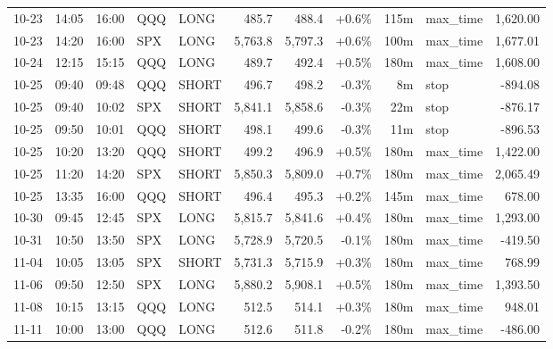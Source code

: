 \documentclass[11pt,a4paper,twoside]{article}
\begin{document}
\begin{center}
\begin{longtable}{>{\color{txtmain}}l l l l l r r r r >{\color{txtmain}}l r}
10-23 & 14:05 & 16:00 & QQQ & LONG & 485.7 & 488.4 & \textcolor{wingreen}{+0.6\%} & 115m & max\_time & \textcolor{wingreen}{1,620.00} \\
10-23 & 14:20 & 16:00 & SPX & LONG & 5,763.8 & 5,797.3 & \textcolor{wingreen}{+0.6\%} & 100m & max\_time & \textcolor{wingreen}{1,677.01} \\
10-24 & 12:15 & 15:15 & QQQ & LONG & 489.7 & 492.4 & \textcolor{wingreen}{+0.5\%} & 180m & max\_time & \textcolor{wingreen}{1,608.00} \\
10-25 & 09:40 & 09:48 & QQQ & SHORT & 496.7 & 498.2 & \textcolor{lossred}{-0.3\%} & 8m & stop & \textcolor{lossred}{-894.08} \\
10-25 & 09:40 & 10:02 & SPX & SHORT & 5,841.1 & 5,858.6 & \textcolor{lossred}{-0.3\%} & 22m & stop & \textcolor{lossred}{-876.17} \\
10-25 & 09:50 & 10:01 & QQQ & SHORT & 498.1 & 499.6 & \textcolor{lossred}{-0.3\%} & 11m & stop & \textcolor{lossred}{-896.53} \\
10-25 & 10:20 & 13:20 & QQQ & SHORT & 499.2 & 496.9 & \textcolor{wingreen}{+0.5\%} & 180m & max\_time & \textcolor{wingreen}{1,422.00} \\
10-25 & 11:20 & 14:20 & SPX & SHORT & 5,850.3 & 5,809.0 & \textcolor{wingreen}{+0.7\%} & 180m & max\_time & \textcolor{wingreen}{2,065.49} \\
10-25 & 13:35 & 16:00 & QQQ & SHORT & 496.4 & 495.3 & \textcolor{wingreen}{+0.2\%} & 145m & max\_time & \textcolor{wingreen}{678.00} \\
10-30 & 09:45 & 12:45 & SPX & LONG & 5,815.7 & 5,841.6 & \textcolor{wingreen}{+0.4\%} & 180m & max\_time & \textcolor{wingreen}{1,293.00} \\
10-31 & 10:50 & 13:50 & SPX & LONG & 5,728.9 & 5,720.5 & \textcolor{lossred}{-0.1\%} & 180m & max\_time & \textcolor{lossred}{-419.50} \\
11-04 & 10:05 & 13:05 & SPX & SHORT & 5,731.3 & 5,715.9 & \textcolor{wingreen}{+0.3\%} & 180m & max\_time & \textcolor{wingreen}{768.99} \\
11-06 & 09:50 & 12:50 & SPX & LONG & 5,880.2 & 5,908.1 & \textcolor{wingreen}{+0.5\%} & 180m & max\_time & \textcolor{wingreen}{1,393.50} \\
11-08 & 10:15 & 13:15 & QQQ & LONG & 512.5 & 514.1 & \textcolor{wingreen}{+0.3\%} & 180m & max\_time & \textcolor{wingreen}{948.01} \\
11-11 & 10:00 & 13:00 & QQQ & LONG & 512.6 & 511.8 & \textcolor{lossred}{-0.2\%} & 180m & max\_time & \textcolor{lossred}{-486.00} \\

\end{longtable}
\end{center}
\end{document}
